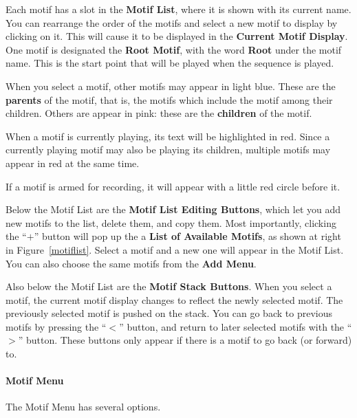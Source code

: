 \documentclass[twoside,10pt]{article}
\begin{document}
Each motif has a slot in the {\bf Motif List}, where it is shown with its current name.  You can rearrange the order of the motifs and select a new motif to display by clicking on it.  This will cause it to be displayed in the {\bf Current Motif Display}.  One motif is designated the {\bf Root Motif}, with the word {\bf Root} under the motif name.  This is the start point that will be played when the sequence is played.

When you select a motif, other motifs may appear in light blue.  These are the {\bf parents} of the motif, that is, the motifs which include the motif among their children.  Others are appear in pink: these are the {\bf children} of the motif.

When a motif is currently playing, its text will be highlighted in red.  Since a currently playing motif may also be playing its children, multiple motifs may appear in red at the same time.  

If a motif is armed for recording, it will appear with a little red circle before it.

Below the Motif List are the {\bf Motif List Editing Buttons}, which let you add new motifs to the list, delete them, and copy them.   Most importantly, clicking the ``\(+\)'' button will pop up the a {\bf List of Available Motifs}, as shown at right in Figure~\ref{motiflist}.  Select a motif and a new one will appear in the Motif List.   You can also choose the same motifs from the {\bf Add Menu}.

Also below the Motif List are the {\bf Motif Stack Buttons}.  When you select a motif, the current motif display changes to reflect the newly selected motif.  The previously selected motif is pushed on the stack.  You can go back to previous motifs by pressing the ``\(<\)'' button, and return to later selected motifs with the ``\(>\)'' button.  These buttons only appear if there is a motif to go back (or forward) to.

\paragraph{Motif Menu}

The Motif Menu has several options.  
\end{document}
